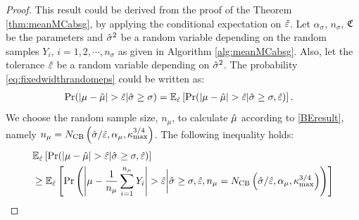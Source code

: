 \documentclass{iitthesis}
\theoremstyle{definition}
\begin{document}
\begin{proof}
This result could be derived from the proof of the Theorem \ref{thm:meanMCabsg}, by applying the conditional expectation on $\hat{\varepsilon}$.
Let $\alpha_\sigma$, $n_\sigma$, $\mathfrak{C}$ be the parameters and $\hat{\sigma}^2$ be a random variable depending on the random samples $Y_i$, $i = 1,2,\cdots, n_{\sigma}$ as given in Algorithm \ref{alg:meanMCabsg}. Also, let the tolerance $\hat{\varepsilon}$ be a random variable depending on $\hat{\sigma}^2$. 
The probability \eqref{eq:fixedwidthrandomeps} could be written as:
\begin{align}
&\Pr(\left \lvert \mu-\hat{\mu} \right \rvert > \hat{\varepsilon}|\hat{\sigma} \geq \sigma) = \mathbb{E}_{\hat{\varepsilon}}\left[\Pr({\left \lvert \mu-\hat{\mu} \right \rvert  > \hat{\varepsilon}}| \hat{\sigma}\geq\sigma , \hat{\varepsilon})\right].
\end{align}
We choose the random sample size, $n_\mu$, to calculate $\hat{\mu}$ according to \eqref{BEresult}, namely $n_\mu= N_{\text{CB}}\left(\hat{\sigma}/\hat{\varepsilon},\alpha_\mu, \kappa_{\max}^{3/4}\right)$. 
The following inequality holds:
\begin{align*}
&\e_{\heps}\left[\Pr({\abs{\mu-\hmu}  > \heps}| \hsigma\geq\sigma , \heps)\right]\\
&\geq \e_{\heps}\left[\Pr\left({\abs{\mu-\frac{1}{n_\mu}\sum_{i=1}^{n_\mu}Y_i} > \heps}\bigg \vert \hsigma\geq\sigma , \heps, n_\mu= N_{\CB}\left(\hsigma/\heps,\alpha_\mu, \kmax^{3/4}\right)\right)\right]\\

\end{align*}
\end{proof}
\end{document}
